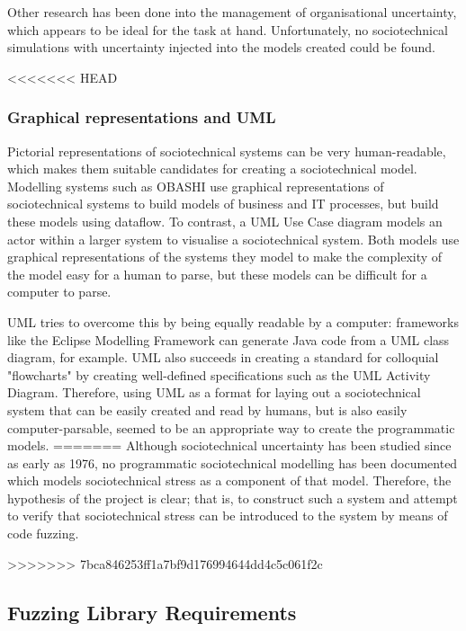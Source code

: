 \documentclass{sig-alternate}
\begin{document}
Other research has been done into the management of organisational uncertainty\cite{Grote2004}\cite{Herrmann1999}, which appears to be ideal for the task at hand. Unfortunately, no sociotechnical simulations with uncertainty injected into the models created could be found. \par

<<<<<<< HEAD
\subsubsection{Graphical representations and UML}
\label{pictorial}
Pictorial representations of sociotechnical systems can be very human-readable, which makes them suitable candidates for creating a sociotechnical model. Modelling systems such as OBASHI\cite{ObashiMethodology} use graphical representations of sociotechnical systems to build models of business and IT processes, but build these models using dataflow. To contrast, a UML Use Case diagram\cite{omg2010omguml} models an actor within a larger system to visualise a sociotechnical system. Both models use graphical representations of the systems they model to make the complexity of the model easy for a human to parse, but these models can be difficult for a computer to parse. \par
UML tries to overcome this by being equally readable by a computer: frameworks like the Eclipse Modelling Framework can generate Java code from a UML class diagram, for example\cite{EMFManual}. UML also succeeds in creating a standard for colloquial "flowcharts" by creating well-defined specifications such as the UML Activity Diagram. Therefore, using UML as a format for laying out a sociotechnical system that can be easily created and read by humans, but is also easily computer-parsable, seemed to be an appropriate way to create the programmatic models.
=======
Although sociotechnical uncertainty has been studied since as early as 1976\cite{Susman1976}, no programmatic sociotechnical modelling has been documented which models sociotechnical stress as a component of that model. Therefore, the hypothesis of the project is clear; that is, to construct such a system and attempt to verify that sociotechnical stress can be introduced to the system by means of code fuzzing. \par
>>>>>>> 7bca846253ff1a7bf9d176994644dd4c5c061f2c

\subsection{Fuzzing Library Requirements}\label{planning_fuzzing}
\end{document}
